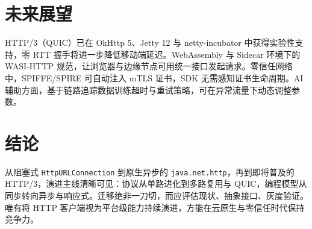 \chapter{未来展望}
HTTP/3（QUIC）已在 OkHttp 5、Jetty 12 与 netty-incubator 中获得实验性支持，零 RTT 握手将进一步降低移动端延迟。WebAssembly 与 Sidecar 环境下的 WASI-HTTP 规范，让浏览器与边缘节点可用统一接口发起请求。零信任网络中，SPIFFE/SPIRE 可自动注入 mTLS 证书，SDK 无需感知证书生命周期。AI 辅助方面，基于链路追踪数据训练超时与重试策略，可在异常流量下动态调整参数。\par
\chapter{结论}
从阻塞式 \texttt{HttpURLConnection} 到原生异步的 \texttt{java.net.http}，再到即将普及的 HTTP/3，演进主线清晰可见：协议从单路进化到多路复用与 QUIC，编程模型从同步转向异步与响应式。迁移绝非一刀切，而应评估现状、抽象接口、灰度验证。唯有将 HTTP 客户端视为平台级能力持续演进，方能在云原生与零信任时代保持竞争力。\par
